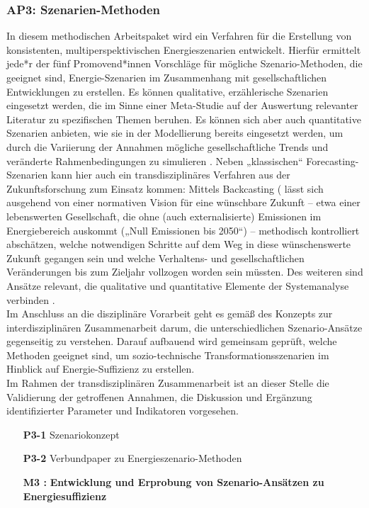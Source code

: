 \documentclass[a4paper,11pt,twoside]{scrartcl}
\begin{document}
\subsubsection*{AP3: Szenarien-Methoden}
In diesem methodischen Arbeitspaket wird ein Verfahren für die Erstellung von konsistenten, multiperspektivischen Energieszenarien entwickelt. Hierfür ermittelt jede*r der fünf Promovend*innen Vorschläge für mögliche Szenario-Methoden, die geeignet sind, Energie-Szenarien im Zusammenhang mit gesellschaftlichen Entwicklungen zu erstellen.
Es können qualitative, erzählerische Szenarien eingesetzt werden, die im Sinne einer Meta-Studie auf der Auswertung relevanter Literatur zu spezifischen Themen beruhen. Es können sich aber auch quantitative Szenarien anbieten, wie sie in der Modellierung bereits eingesetzt werden, um durch die Variierung der Annahmen mögliche gesellschaftliche Trends und veränderte Rahmenbedingungen zu simulieren \cite{Bierwirth2016}. Neben „klassischen“ Forecasting-Szenarien \cite{Kosow2008} kann hier auch ein transdisziplinäres Verfahren aus der Zukunftsforschung zum Einsatz kommen: Mittels Backcasting (\cite{Robinson 2003, Robinson2011} lässt sich ausgehend von einer normativen Vision für eine wünschbare Zukunft – etwa einer lebenswerten Gesellschaft, die ohne (auch externalisierte) Emissionen im Energiebereich auskommt („Null Emissionen bis 2050“) – methodisch kontrolliert abschätzen, welche notwendigen Schritte auf dem Weg in diese wünschenswerte Zukunft gegangen sein und welche Verhaltens- und gesellschaftlichen Veränderungen bis zum Zieljahr vollzogen worden sein müssten. Des weiteren sind Ansätze relevant, die qualitative und quantitative Elemente der Systemanalyse verbinden \cite{WEIMERJEHLE2016}.\\
Im Anschluss an die disziplinäre Vorarbeit geht es gemäß des Konzepts zur interdisziplinären Zusammenarbeit darum, die unterschiedlichen Szenario-Ansätze gegenseitig zu verstehen.
Darauf aufbauend wird gemeinsam geprüft, welche Methoden geeignet sind, um sozio-technische Transformationsszenarien im Hinblick auf Energie-Suffizienz zu erstellen.\\
Im Rahmen der transdisziplinären Zusammenarbeit ist an dieser Stelle die Validierung der getroffenen Annahmen, die Diskussion und Ergänzung identifizierter Parameter und Indikatoren vorgesehen.

\begin{itemize}
    \item[\textbf{P3-1}] Szenariokonzept 
    \item[\textbf{P3-2}] Verbundpaper zu Energieszenario-Methoden 
    \item[\textbf{M3 :}] \textbf{Entwicklung und Erprobung von Szenario-Ansätzen zu Energiesuffizienz}
\end{itemize}
\end{document}
